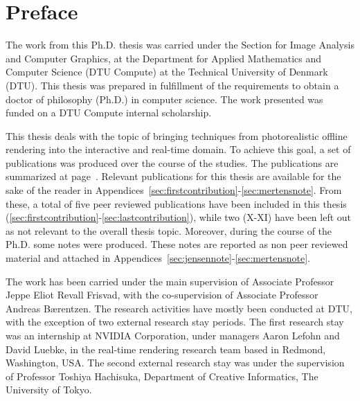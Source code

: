 \chapter{Preface}

The work from this Ph.D. thesis was carried under the Section for Image Analysis and Computer Graphics, at the Department for Applied Mathematics and Computer Science (DTU Compute) at the Technical University of Denmark (DTU). This thesis was prepared in fulfillment of the requirements to obtain a doctor of philosophy (Ph.D.) in computer science. The work presented was funded on a DTU Compute internal scholarship. 

This thesis deals with the topic of bringing techniques from photorealistic offline rendering into the interactive and real-time domain. To achieve this goal, a set of publications was produced over the course of the studies. The publications are summarized at page~\pageref{sec:contributionlist}. Relevant  publications for this thesis are available for the sake of the reader in Appendices~\ref{sec:firstcontribution}-\ref{sec:mertensnote}. From these, a total of five peer reviewed publications have been included in this thesis (\ref{sec:firstcontribution}-\ref{sec:lastcontribution}), while two (X-XI) have been left out as not relevant to the overall thesis topic. Moreover, during the course of the Ph.D. some notes were produced. These notes are reported as non peer reviewed material and attached in Appendices~\ref{sec:jensennote}-\ref{sec:mertensnote}. 

The work has been carried under the main supervision of Associate Professor Jeppe Eliot Revall Frisvad, with the co-supervision of Associate Professor Andreas B\ae rentzen. The research activities have mostly been conducted at DTU, with the exception of two external research stay periods. The first research stay was an internship at NVIDIA Corporation, under managers Aaron Lefohn and David Luebke, in the real-time rendering research team based in Redmond, Washington, USA. The second external research stay was under the supervision of Professor Toshiya Hachisuka, Department of Creative Informatics, The University of Tokyo.

